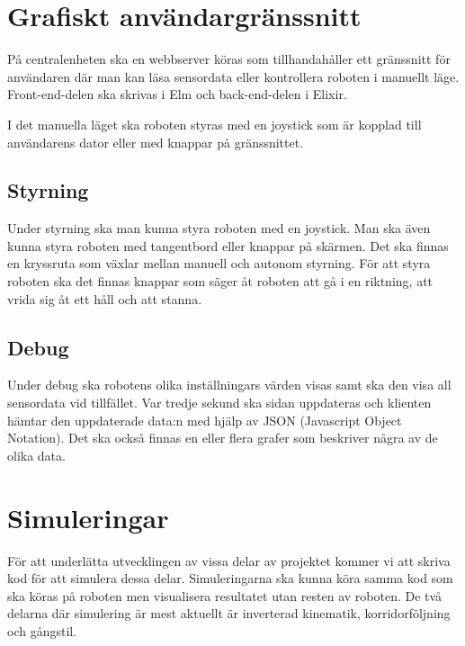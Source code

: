 \documentclass[a4paper,titlepage,12pt]{article}
\begin{document}
	\section{Grafiskt användargränssnitt}
	På centralenheten ska en webbserver köras som tillhandahåller ett gränssnitt
	för användaren där man kan läsa sensordata eller kontrollera roboten i
	manuellt läge. Front-end-delen ska skrivas i Elm och back-end-delen i Elixir.

	I det manuella läget ska roboten styras med en joystick som är kopplad till användarens
	dator eller med knappar på gränssnittet.
    
    \subsection{Styrning}
    Under styrning ska man kunna styra roboten med en joystick. Man ska även
    kunna styra roboten med tangentbord eller knappar på skärmen. Det ska finnas
    en kryssruta som växlar mellan manuell och autonom styrning. För att styra
    roboten ska det finnas knappar som säger åt roboten att gå i en riktning,
    att vrida sig åt ett håll och att stanna.

    \subsection{Debug}
	Under debug ska robotens olika inställningars värden visas samt ska den visa all sensordata vid tillfället. Var tredje sekund ska sidan uppdateras och klienten hämtar den uppdaterade data:n med hjälp av JSON (Javascript Object Notation). Det ska också finnas en eller flera grafer som beskriver några av de olika data.

	\section{Simuleringar}
	För att underlätta utvecklingen av vissa delar av projektet kommer vi att skriva
	kod för att simulera dessa delar. Simuleringarna ska kunna köra samma kod som ska
	köras på roboten men visualisera resultatet utan resten av roboten. De två
	delarna där simulering är mest aktuellt är inverterad kinematik, korridorföljning 
	och gångstil.
\end{document}
